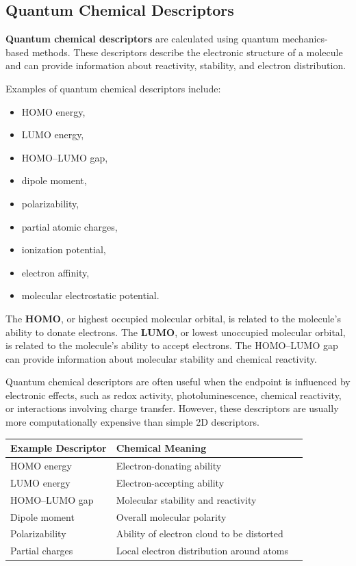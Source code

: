 \documentclass[11pt]{report}
\newenvironment{Important note}{\begin{quote}\color{red}\textbf{Important note:} }{\end{quote}}
\begin{document}
\subsection{Quantum Chemical Descriptors}

\textbf{Quantum chemical descriptors} are calculated using quantum mechanics-based methods. These descriptors describe the electronic structure of a molecule and can provide information about reactivity, stability, and electron distribution.

Examples of quantum chemical descriptors include:

\begin{itemize}[leftmargin=*]
    \item HOMO energy,
    \item LUMO energy,
    \item HOMO--LUMO gap,
    \item dipole moment,
    \item polarizability,
    \item partial atomic charges,
    \item ionization potential,
    \item electron affinity,
    \item molecular electrostatic potential.
\end{itemize}

The \textbf{HOMO}, or highest occupied molecular orbital, is related to the molecule's ability to donate electrons. The \textbf{LUMO}, or lowest unoccupied molecular orbital, is related to the molecule's ability to accept electrons. The HOMO--LUMO gap can provide information about molecular stability and chemical reactivity.

Quantum chemical descriptors are often useful when the endpoint is influenced by electronic effects, such as redox activity, photoluminescence, chemical reactivity, or interactions involving charge transfer. However, these descriptors are usually more computationally expensive than simple 2D descriptors.

\begin{center}
\begin{tabular}{lll}
\toprule
\textbf{Example Descriptor} & \textbf{Chemical Meaning} \\
\midrule
HOMO energy & Electron-donating ability \\
LUMO energy & Electron-accepting ability \\
HOMO--LUMO gap & Molecular stability and reactivity \\
Dipole moment & Overall molecular polarity \\
Polarizability & Ability of electron cloud to be distorted \\
Partial charges & Local electron distribution around atoms \\
\bottomrule
\end{tabular}
\end{center}
\end{document}
